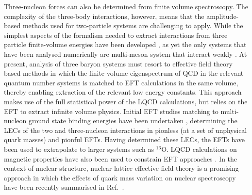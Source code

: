 Three-nucleon forces can also be determined from finite volume spectroscopy.   The complexity of the three-body interactions, however, means that the amplitude-based methods used for two-particle systems are challenging to apply. While the simplest aspects of the formalism needed to extract interactions from three particle finite-volume energies have been developed \cite{Beane:2007qr,Detmold:2008gh,Tan:2007bg,Kreuzer:2010ti,Polejaeva:2012ut,Briceno:2012rv,Hansen:2014eka}, as yet the only systems that have been analysed numerically are multi-meson system that interact weakly \cite{Beane:2007es}. At present, analysis of three baryon systems must resort to  effective field theory based methods \cite{Detmold:2012wpa,Detmold:2013wda,Detmold:2015jda,Kirscher:2015tka,Davoudi:2017ddj,Savage:2016egr} in which the finite volume eigenspectrum of QCD in the relevant quantum number systems is matched to EFT calculations in the same volume, thereby enabling extraction of the relevant low energy constants. This approach makes use of the full statistical power of the LQCD calculations, but relies on the EFT to extract infinite volume physics. Initial EFT studies matching to multi-nucleon ground state binding energies have been undertaken \cite{Barnea:2013uqa,Bansal:2017pwn,Contessi:2017rww,Gandolfi:2017arm}, determining the LECs of the two and three-nucleon interactions in pionless (at a set of unphysical quark masses) and pionful EFTs. Having determined these LECs, the EFTs have been used to extrapolate to larger systems such as $^{16}$O. LQCD calculations on magnetic properties have also been used to constrain EFT approaches \cite{Kirscher:2017fqc}. In the context of nuclear structure, nuclear lattice effective field theory \cite{Lahde:2019npb} is a promising approach in which the effects of quark mass variation on nuclear spectroscopy have been recently summarised in Ref.~\cite{Lahde:2019yvr}.

